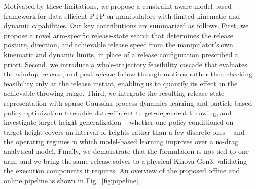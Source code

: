 \documentclass[letterpaper, 10 pt, conference]{ieeeconf}
\begin{document}
Motivated by these limitations, we propose a constraint-aware model-based framework for data-efficient PTP on manipulators with limited kinematic and dynamic capabilities. Our key contributions are summarized as follows. First, we propose a novel arm-specific release-state search that determines the release posture, direction, and achievable release speed from the manipulator's own kinematic and dynamic limits, in place of a release configuration prescribed a priori. Second, we introduce a whole-trajectory feasibility cascade that evaluates the windup, release, and post-release follow-through motions rather than checking feasibility only at the release instant, enabling us to quantify its effect on the achievable throwing range. Third, we integrate the resulting release-state representation with sparse Gaussian-process dynamics learning and particle-based policy optimization to enable data-efficient target-dependent throwing, and investigate target-height generalization -- whether one policy conditioned on target height covers an interval of heights rather than a few discrete ones -- and the operating regimes in which model-based learning improves over a no-drag analytical model. Finally, we demonstrate that the formulation is not tied to one arm, and we bring the same release solver to a physical Kinova Gen3, validating the execution components it requires. An overview of the proposed offline and online pipeline is shown in Fig.~\ref{fig:pipeline}.



\end{document}
